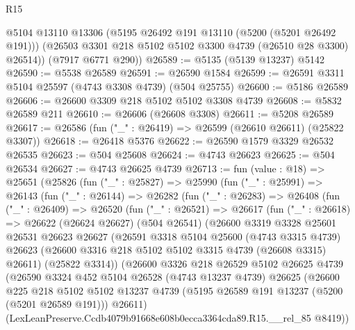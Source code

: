 \begin{lexlean}{R15}
\begin{coremodule}
{{{{{{{{{{{        @5104
        @13110
        @13306
        (@5195 @26492 @191 @13110 (@5200 (@5201 @26492 @191)))
        (@26503 @3301 @218 @5102 @5102 @3300 @4739 (@26510 @28 @3300) @26514))
      (@7917 @6771 @290))
@26589 := @5135 (@5139 @13237) @5142
@26590 := @5538 @26589
@26591 := @26590 @1584
@26599 := @26591 @3311 @5104 @25597 (@4743 @3308 @4739) (@504 @25755)
@26600 := @5186 @26589
@26606 := @26600 @3309 @218 @5102 @5102 @3308 @4739
@26608 := @5832 @26589 @211
@26610 := @26606 (@26608 @3308)
@26611 := @5208 @26589
@26617 := @26586 (fun ("_" : @26419) => @26599 (@26610 @26611) (@25822 @3307))
@26618 := @26418 @5376
@26622 := @26590 @1579 @3329 @26532 @26535
@26623 := @504 @25608
@26624 := @4743 @26623
@26625 := @504 @26534
@26627 := @4743 @26625 @4739
@26713 := fun (value : @18) =>
  @25651
    (@25826
      (fun ("_" : @25827) =>
      @25990
        (fun ("_" : @25991) =>
        @26143
          (fun ("_" : @26144) =>
          @26282
            (fun ("_" : @26283) =>
            @26408
              (fun ("_" : @26409) =>
              @26520
                (fun ("_" : @26521) =>
                @26617
                  (fun ("_" : @26618) =>
                  @26622
                    (@26624 @26627)
                    (@504 @26541)
                    (@26600
                      @3319
                      @3328
                      @25601
                      @26531
                      @26623
                      @26627
                      (@26591
                        @3318
                        @5104
                        @25600
                        (@4743 @3315 @4739)
                        @26623
                        (@26600 @3316 @218 @5102 @5102 @3315 @4739 (@26608 @3315) @26611)
                        (@25822 @3314))
                      (@26600
                        @3326
                        @218
                        @26529
                        @5102
                        @26625
                        @4739
                        (@26590
                          @3324
                          @452
                          @5104
                          @26528
                          (@4743 @13237 @4739)
                          @26625
                          (@26600
                            @225
                            @218
                            @5102
                            @5102
                            @13237
                            @4739
                            (@5195 @26589 @191 @13237 (@5200 (@5201 @26589 @191)))
                            @26611)
                          (LexLeanPreserve.Ccdb4079b91668e608b0ecca3364cda89.R15.__rel_85 @8419))
}}}}}}}}}}}
\end{coremodule}
\end{lexlean}
